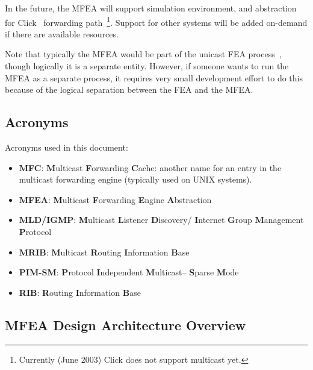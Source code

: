 \documentclass[11pt]{article}
\begin{document}
In the future, the MFEA will support simulation environment, and
abstraction for Click~\cite{CLICK-PROJECT} forwarding
path~\footnote{Currently (June 2003) Click does
not support multicast yet.}. Support for other systems will be added
on-demand if there are available resources.

Note that typically the MFEA would be part of the unicast FEA
process~\cite{xorp:fea}, though logically it is a separate entity.
However, if someone wants to run the MFEA as a separate process, it
requires very small development effort to do this because of the logical
separation between the FEA and the MFEA.

\subsection{Acronyms}

Acronyms used in this document:

\begin{itemize}

  \item {\bf MFC}: {\bf M}ulticast {\bf F}orwarding {\bf C}ache: another
  name for an entry in the multicast forwarding engine (typically used
  on UNIX systems).

  \item {\bf MFEA}: {\bf M}ulticast {\bf F}orwarding {\bf E}ngine
  {\bf A}bstraction

  \item {\bf MLD/IGMP}: {\bf M}ulticast {\bf L}istener {\bf D}iscovery/{\bf
  I}nternet {\bf G}roup {\bf M}anagement {\bf P}rotocol

  \item {\bf MRIB}: {\bf M}ulticast {\bf R}outing {\bf I}nformation
  {\bf B}ase

  \item {\bf PIM-SM}: {\bf P}rotocol {\bf I}ndependent {\bf M}ulticast--{\bf
  S}parse {\bf M}ode

  \item {\bf RIB}: {\bf R}outing {\bf I}nformation {\bf B}ase

\end{itemize}


\subsection{MFEA Design Architecture Overview}
\end{document}
